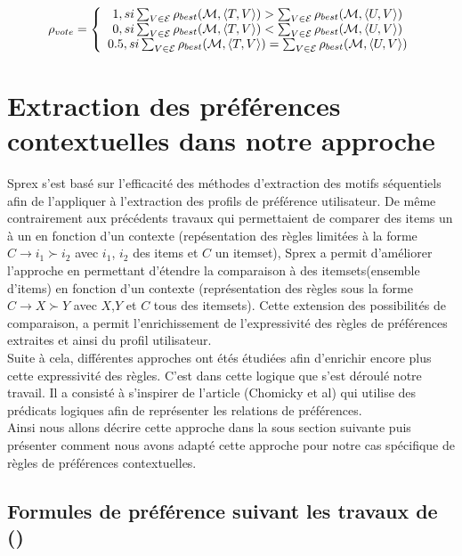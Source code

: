 \documentclass[a4paper,12pt,openany,oneside]{article}
\begin{document}
\[\rho_{vote}=
\left \{
\begin{array}{c c}
    1, si \sum_{V\in \mathcal{E}}\rho_{best}(\mathcal{M},\left<T,V\right>)>\sum_{V\in\mathcal{E}}\rho_{best}(\mathcal{M},\left<U,V\right>) \\
    0, si \sum_{V\in \mathcal{E}}\rho_{best}(\mathcal{M},\left<T,V\right>)<\sum_{V\in\mathcal{E}}\rho_{best}(\mathcal{M},\left<U,V\right>) \\
    0.5, si \sum_{V\in \mathcal{E}}\rho_{best}(\mathcal{M},\left<T,V\right>)=\sum_{V\in\mathcal{E}}\rho_{best}(\mathcal{M},\left<U,V\right>) \\
\end{array}
\right.
\]



\section{Extraction des préférences contextuelles dans notre approche}

Sprex s'est basé sur l'efficacité des méthodes d'extraction des motifs séquentiels afin de l'appliquer à l'extraction des profils de préférence utilisateur. De même contrairement aux précédents travaux qui permettaient de comparer des items un à un en fonction d'un contexte (repésentation des règles limitées à la forme $C\rightarrow i_1\succ i_2$ avec $i_1$, $i_2$ des items et $C$ un itemset), Sprex a permit d'améliorer l'approche en permettant d'étendre la comparaison à des itemsets(ensemble d'items) en fonction d'un contexte (représentation des règles sous la forme $C\rightarrow X\succ Y$ avec $X$,$Y$ et $C$ tous des itemsets). Cette extension des possibilités de comparaison, a permit l'enrichissement de l'expressivité des règles de préférences extraites et ainsi du profil utilisateur.\\ 
Suite à cela, différentes approches ont étés étudiées afin d'enrichir encore plus cette expressivité des règles. C'est dans cette logique que s'est déroulé notre travail. Il a consisté à s'inspirer de l'article (Chomicky et al) qui utilise des prédicats logiques afin de représenter les relations de préférences.\\
 Ainsi nous allons décrire cette approche dans la sous section suivante puis présenter comment nous avons adapté cette approche pour notre cas spécifique de règles de préférences contextuelles.


\subsection{Formules de préférence suivant les travaux de (\cite{CHO})}
\end{document}
